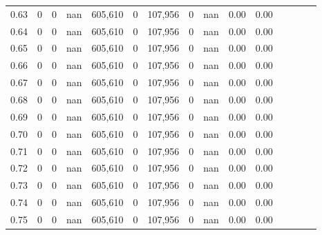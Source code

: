 \begin{tabular}{rrrcrrrrrrrrrrr}
0.63 &        0 &       0 &                                        nan &  605,610 &        0 &  107,956 &        0 &   nan &  0.00 &                         0.00 \\
0.64 &        0 &       0 &                                        nan &  605,610 &        0 &  107,956 &        0 &   nan &  0.00 &                         0.00 \\
0.65 &        0 &       0 &                                        nan &  605,610 &        0 &  107,956 &        0 &   nan &  0.00 &                         0.00 \\
0.66 &        0 &       0 &                                        nan &  605,610 &        0 &  107,956 &        0 &   nan &  0.00 &                         0.00 \\
0.67 &        0 &       0 &                                        nan &  605,610 &        0 &  107,956 &        0 &   nan &  0.00 &                         0.00 \\
0.68 &        0 &       0 &                                        nan &  605,610 &        0 &  107,956 &        0 &   nan &  0.00 &                         0.00 \\
0.69 &        0 &       0 &                                        nan &  605,610 &        0 &  107,956 &        0 &   nan &  0.00 &                         0.00 \\
0.70 &        0 &       0 &                                        nan &  605,610 &        0 &  107,956 &        0 &   nan &  0.00 &                         0.00 \\
0.71 &        0 &       0 &                                        nan &  605,610 &        0 &  107,956 &        0 &   nan &  0.00 &                         0.00 \\
0.72 &        0 &       0 &                                        nan &  605,610 &        0 &  107,956 &        0 &   nan &  0.00 &                         0.00 \\
0.73 &        0 &       0 &                                        nan &  605,610 &        0 &  107,956 &        0 &   nan &  0.00 &                         0.00 \\
0.74 &        0 &       0 &                                        nan &  605,610 &        0 &  107,956 &        0 &   nan &  0.00 &                         0.00 \\
0.75 &        0 &       0 &                                        nan &  605,610 &        0 &  107,956 &        0 &   nan &  0.00 &                         0.00 \\

\end{tabular}
